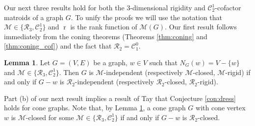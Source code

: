 \documentclass[11pt,a4paper]{article}
\theoremstyle{definition}
\newtheorem{lemma}[theorem]{Lemma}
\DeclareMathOperator{\rr}{r}
\newcommand{\cR}{\mathcal{R}}
\newcommand{\cM}{\mathcal{M}}
\newcommand{\cC}{\mathcal{C}}
\begin{document}
Our next three results hold for both the 3-dimensional rigidity and $\cC_2^1$-cofactor matroids of a graph $G$. To unify the proofs we will use the notation that  $\cM\in \{\cR_3,\cC_2^1\}$ and $\rr$ is the rank function of $\cM(G)$. 
Our first result follows immediately from the coning theorems (Theorems \ref{thm:coning} and \ref{thm:coning_cof})
and the fact that $\cR_2=\cC_1^0$.

\begin{lemma}\label{lem:cone0}
Let  $G=(V,E)$ be a  graph, $w\in V$ such that $N_G(w)=V-\{w\}$ 
and $\cM\in \{\cR_3,\cC_2^1\}$. Then 
$G$ is $\cM$-independent (respectively $\cM$-closed, $\cM$-rigid) if and only if $G-w$ is $\cR_2$-independent (respectively $\cR_2$-closed, $\cR_2$-rigid).
\end{lemma}

Part (b) of our next result implies a result of Tay \cite{Taycon} that Conjecture \ref{con:dress} 
holds for cone graphs. Note that, by Lemma \ref{lem:cone0}, a cone graph $G$ with cone vertex $w$ is $\cM$-closed for some $\cM\in \{\cR_3,\cC_2^1\}$ if and only if $G-w$ is $\cR_2$-closed.
\end{document}
